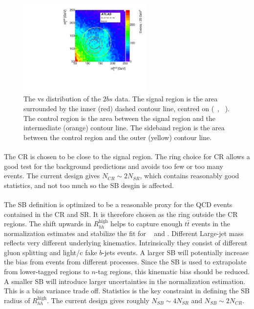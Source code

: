 \begin{figure}[htbp!]
\begin{center}
  \includegraphics[width=0.6\textwidth,angle=-90]{figures/boosted/Other/TwoTag_split_Incl_data_mH0H1.pdf}
  \caption{The \mleadJ vs \msublJ distribution of the $2bs$ data. The signal region is the area surrounded by the inner (red) dashed contour line, centred on (~\GeV, ~\GeV). The control region is the area between the signal region and the intermediate (orange) contour line. The sideband region is the area between the control region and the outer (yellow) contour line.}
  \label{fig:boosted-region-def}
\end{center}
\end{figure}

\paragraph{}
The CR is chosen to be close to the signal region.
The ring choice for CR allows a good test for the background predictions and avoids too few or too many \ttbar~ events.
The current design gives $N_{CR} \sim 2 N_{SR}$, which contains reasonably good statistics, and not too much so the SB desgin is affected.

\paragraph{}
The SB definition is optimized to be a reasonable proxy for the QCD events contained in the CR and SR.
It is therefore chosen as the ring outside the CR regions.
The shift upwards in $R_{hh}^{\text{high}}$ helps to capture enough $t\bar{t}$ events in the normalization estimates and stabilize the fit for \muqcd~ and \alphatt.
Different Large-\R jet mass reflects very different underlying kinematics.
Intrinsically they consist of different gluon splitting and light/c fake $b$-jets events.
A larger SB will potentially increase the bias from events from different processes.
Since the SB is used to extrapolate from lower-tagged regions to $n$-tag regions, this kinematic bias should be reduced.
A smaller SB will introduce larger uncertainties in the normalization estimation.
This is a bias variance trade off.
Statistics is the key constraint in defining the SB radius of $R_{hh}^{\text{high}}$.
The current design gives roughly $N_{SB} \sim 4 N_{SR}$ and $N_{SB} \sim 2 N_{CR}$.

